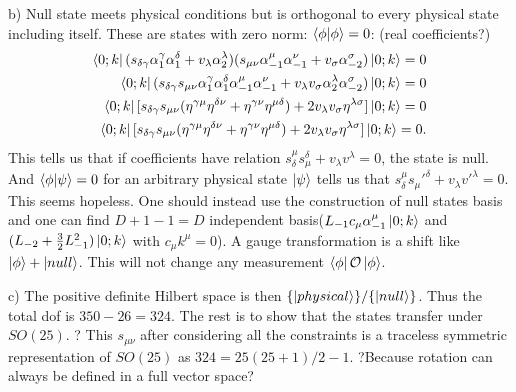 \documentclass[12pt]{article}
\begin{document}
\begin{paragraph}{b)}
Null state meets physical conditions but is orthogonal to every physical state including itself. These are states with zero norm: $\bra{\phi}\ket{\phi}=0$: (real coefficients?)
\begin{equation}
\begin{aligned}[t]
\bra{0;k}(s_{\delta\gamma}\alpha_{1}^\gamma\alpha_{1}^\delta+v_\lambda\alpha_{2}^\lambda)(s_{\mu\nu}\alpha_{-1}^\mu\alpha_{-1}^\nu+v_\sigma\alpha_{-2}^\sigma)\ket{0;k}=0\\
\bra{0;k}(s_{\delta\gamma} s_{\mu\nu} \alpha_1^\gamma\alpha_1^\delta\alpha_{-1}^\mu\alpha_{-1}^\nu+v_\lambda v_\sigma \alpha_2^\lambda \alpha_{-2}^\sigma)\ket{0;k}=0\\
\bra{0;k}[s_{\delta\gamma} s_{\mu\nu} (\eta^{\gamma\mu}\eta^{\delta\nu}+\eta^{\gamma\nu}\eta^{\mu\delta}) +2 v_\lambda v_\sigma \eta^{\lambda\sigma}]\ket{0;k}=0\\
\bra{0;k}[s_{\delta\gamma} s_{\mu\nu} (\eta^{\gamma\mu}\eta^{\delta\nu}+\eta^{\gamma\nu}\eta^{\mu\delta}) +2 v_\lambda v_\sigma \eta^{\lambda\sigma}]\ket{0;k}=0.
\end{aligned}
\end{equation}
This tells us that if coefficients have relation $s_\delta^\mu s_\mu^\delta+v_\lambda v^\lambda=0$, the state is null. And $\bra{\phi}\ket{\psi}=0$ for an arbitrary physical state $\ket{\psi}$ tells us that $s_\delta^\mu s_\mu'^\delta+v_\lambda v'^{\lambda}=0$.\\

This seems hopeless. One should instead use the construction of null states basis and one can find $D+1-1=D$ independent basis($L_{-1}c_\mu\alpha_{-1}^\mu\ket{0;k}$ and $(L_{-2}+\frac{3}{2}L_{-1}^2)\ket{0;k}$ with $c_\mu k^\mu=0$). A gauge transformation is a shift like $\ket{\phi}+\ket{null}$. This will not change any measurement $\bra{\phi}\mathcal{O}\ket{\phi}$.
\end{paragraph}
\begin{paragraph}{c)}
The positive definite Hilbert space is then $\{\ket{physical}\}/\{\ket{null}\}$. Thus the total dof is $350-26=324$. The rest is to show that the states transfer under $SO(25)$. ? This $s_{\mu\nu}$ after considering all the constraints is a traceless symmetric representation of $SO(25)$ as $324=25(25+1)/2-1$. ?Because rotation can always be defined in a full vector space?
\end{paragraph}
\end{document}
